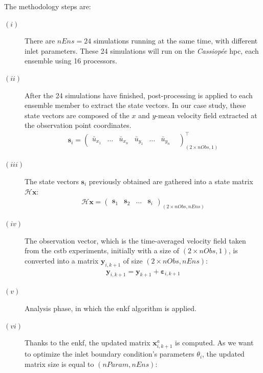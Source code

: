 \documentclass[12pt,twoside]{report}
\newcommand{\Hx}{\mathcal{H}\mathbf{x} }
\begin{document}
The methodology steps are:
\begin{description}
    \item[$(i)$] There are $nEns=24$ simulations running at the same time, with different inlet parameters. These 24 simulations will run on the \textsl{Cassiopée} \gls{hpc}, each ensemble using 16 processors.
    \item[$(ii)$] After the 24 simulations have finished, post-processing is applied to each ensemble member to extract the state vectors. In our case study, these state vectors are composed of the $x$ and $y$-mean velocity field extracted at the observation point coordinates. \\
    \begin{align}
        \mathbf{s}_i=
        \begin{pmatrix}
            \bar{u}_{x_1} &
            \dots &
            \bar{u}_{x_n} &
            \bar{u}_{y_1} &
            \dots &
            \bar{u}_{y_n} &
        \end{pmatrix}^{\top}_{\left( 2\times nObs, 1\right)}
    \end{align}
    \item[$(iii)$] The state vectors $\mathbf{s}_i$ previously obtained are gathered into a state matrix $\Hx$: \\
    \begin{align}
    \Hx = 
        \begin{pmatrix}
            \mathbf{s}_1 & \mathbf{s}_2 & \dots & \mathbf{s}_i
        \end{pmatrix}_{\left( 2\times nObs, nEns\right)}
    \end{align}
    \item[$(iv)$] The observation vector, which is the time-averaged velocity field taken from the \gls{cstb} experiments, initially with a size of $\left(2\times nObs, 1\right)$, is converted into a matrix $\mathbf{y}_{i,k+1}$ of size $\left(2\times nObs, nEns\right)$:
    \begin{align}
        \mathbf{y}_{i,k+1} = \mathbf{y}_{k+1} + \bm{\varepsilon}_{i, k+1}
    \end{align}
    \item[$(v)$] Analysis phase, in which the \gls{enkf} algorithm is applied. 
    \item[$(vi)$] Thanks to the \gls{enkf}, the updated matrix $\mathbf{x}^a_{i,k+1}$ is computed. As we want to optimize the inlet boundary condition's parameters $\theta_i$, the updated matrix size is equal to $\left( nParam, nEns \right)$:
    \begin{align}

\end{align}
\end{description}
\end{document}
